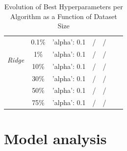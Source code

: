 \documentclass[12pt, titlepage]{article}
\begin{document}
\begin{table}[ht]
\begin{tabular}{|l|c|c|c|c|c|c|}
        \hline
        \multirow{4}{*}{\textit{Ridge}} 
        & 0.1\% & 'alpha': 0.1 & / & / \\
        & 1\% & 'alpha': 0.1 & / & / \\
        & 10\% & 'alpha': 0.1 & / & / \\
        & 30\% & 'alpha': 0.1 & / & / \\
        & 50\% & 'alpha': 0.1 & / & / \\
        & 75\% & 'alpha': 0.1 & / & / \\
        \hline
    \end{tabular}
    \caption{Evolution of Best Hyperparameters per Algorithm as a Function of Dataset Size}
    \label{tab:hyperparameters}
\end{table}


\section{Model analysis}
\end{document}
